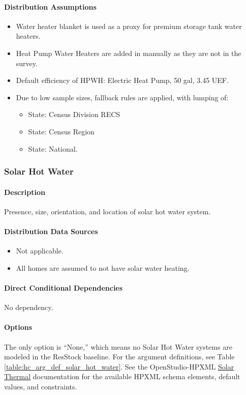 \paragraph{Distribution Assumptions}\label{assumption-83}
\begin{itemize}
\item
  Water heater blanket is used as a proxy for premium storage tank water
  heaters.
\item
  Heat Pump Water Heaters are added in manually as they are not in the
  survey.
\item
  Default efficiency of HPWH: Electric Heat Pump, 50 gal, 3.45 UEF.
\item
  Due to low sample sizes, fallback rules are applied, with lumping of:
  
  \begin{itemize}
  \item
    State: Census Division RECS
  \item
    State: Census Region
    \item
    State: National.
  \end{itemize}
\end{itemize}

\subsubsection{Solar Hot Water}\label{solar_hot_water}
\paragraph{Description}
Presence, size, orientation, and location of solar hot water system. 

\paragraph{Distribution Data Sources}
\begin{itemize}
\item
  Not applicable.
\item
  All homes are assumed to not have solar water heating.
\end{itemize}

\paragraph{Direct Conditional Dependencies}
No dependency.

\paragraph{Options}
The only option is ``None,'' which means no Solar Hot Water systems are modeled in the ResStock baseline. For the argument definitions, see Table \ref{table:hc_arg_def_solar_hot_water}. See the OpenStudio-HPXML \href{https://openstudio-hpxml.readthedocs.io/en/v1.8.1/workflow_inputs.html#hpxml-solar-thermal}{Solar Thermal} documentation for the available HPXML schema elements, default values, and constraints.

